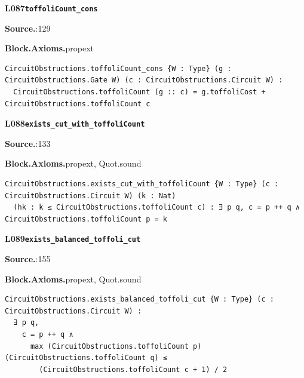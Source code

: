 \par\medskip\noindent\begin{minipage}{\textwidth}
{\small\bfseries L087\enspace\texttt{toffoliCount\_cons}\par}
{\footnotesize\raggedright\textbf{Source.}\enspace{}:129\par
\textbf{Block.}\quad\textbf{Axioms.}\enspace propext\par}\nopagebreak
\begin{lstlisting}
CircuitObstructions.toffoliCount_cons {W : Type} (g : CircuitObstructions.Gate W) (c : CircuitObstructions.Circuit W) :
  CircuitObstructions.toffoliCount (g :: c) = g.toffoliCost + CircuitObstructions.toffoliCount c
\end{lstlisting}
\end{minipage}\par

\par\medskip\noindent\begin{minipage}{\textwidth}
{\small\bfseries L088\enspace\texttt{exists\_cut\_with\_toffoliCount}\par}
{\footnotesize\raggedright\textbf{Source.}\enspace{}:133\par
\textbf{Block.}\quad\textbf{Axioms.}\enspace propext, Quot.sound\par}\nopagebreak
\begin{lstlisting}
CircuitObstructions.exists_cut_with_toffoliCount {W : Type} (c : CircuitObstructions.Circuit W) (k : Nat)
  (hk : k ≤ CircuitObstructions.toffoliCount c) : ∃ p q, c = p ++ q ∧ CircuitObstructions.toffoliCount p = k
\end{lstlisting}
\end{minipage}\par

\par\medskip\noindent\begin{minipage}{\textwidth}
{\small\bfseries L089\enspace\texttt{exists\_balanced\_toffoli\_cut}\par}
{\footnotesize\raggedright\textbf{Source.}\enspace{}:155\par
\textbf{Block.}\quad\textbf{Axioms.}\enspace propext, Quot.sound\par}\nopagebreak
\begin{lstlisting}
CircuitObstructions.exists_balanced_toffoli_cut {W : Type} (c : CircuitObstructions.Circuit W) :
  ∃ p q,
    c = p ++ q ∧
      max (CircuitObstructions.toffoliCount p) (CircuitObstructions.toffoliCount q) ≤
        (CircuitObstructions.toffoliCount c + 1) / 2
\end{lstlisting}
\end{minipage}\par

